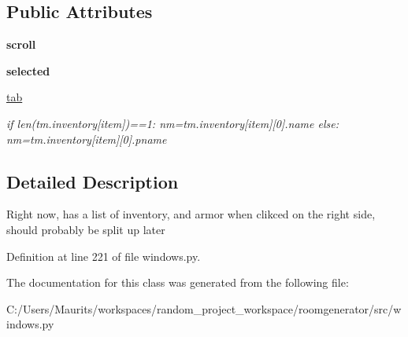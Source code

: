 \subsection*{Public Attributes}
\begin{DoxyCompactItemize}
\item 
\hypertarget{classwindows_1_1_inventory_window_aadb5cd90f6980eb79db2e46cb072c743}{}{\bfseries scroll}\label{classwindows_1_1_inventory_window_aadb5cd90f6980eb79db2e46cb072c743}

\item 
\hypertarget{classwindows_1_1_inventory_window_aa9901c0b1c67b1e7dc8b725986f18a2d}{}{\bfseries selected}\label{classwindows_1_1_inventory_window_aa9901c0b1c67b1e7dc8b725986f18a2d}

\item 
\hypertarget{classwindows_1_1_inventory_window_aa7d0ff071e6d8681ead5ff78517c27b3}{}\hyperlink{classwindows_1_1_inventory_window_aa7d0ff071e6d8681ead5ff78517c27b3}{tab}\label{classwindows_1_1_inventory_window_aa7d0ff071e6d8681ead5ff78517c27b3}

\begin{DoxyCompactList}\small\item\em if len(tm.\+inventory\mbox{[}item\mbox{]})==1\+: nm=tm.\+inventory\mbox{[}item\mbox{]}\mbox{[}0\mbox{]}.name else\+: nm=tm.\+inventory\mbox{[}item\mbox{]}\mbox{[}0\mbox{]}.pname \end{DoxyCompactList}\end{DoxyCompactItemize}


\subsection{Detailed Description}
\begin{DoxyVerb}Right now, has a list of inventory, and armor when clikced on the right side, should probably be split up later\end{DoxyVerb}
 

Definition at line 221 of file windows.\+py.



The documentation for this class was generated from the following file\+:\begin{DoxyCompactItemize}
\item 
C\+:/\+Users/\+Maurits/workspaces/random\+\_\+project\+\_\+workspace/roomgenerator/src/windows.\+py\end{DoxyCompactItemize}
